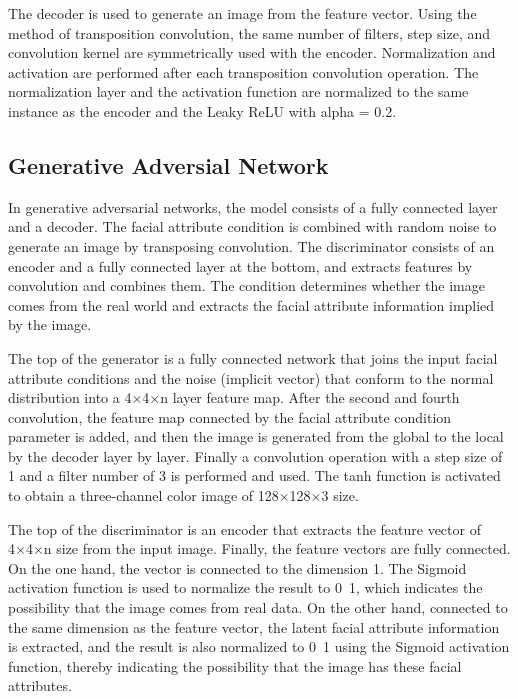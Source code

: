 The decoder is used to generate an image from the feature vector.
Using the method of transposition convolution, the same number of filters,
    step size, and convolution kernel are symmetrically used with the encoder.
Normalization and activation are performed after each transposition convolution operation.
The normalization layer and the activation function are normalized to the same instance as the encoder and the Leaky ReLU with alpha = 0.2.


\subsection{Generative Adversial Network}

In generative adversarial networks, the model consists of a fully connected layer and a decoder.
The facial attribute condition is combined with random noise to generate an image by transposing convolution.
The discriminator consists of an encoder and a fully connected layer at the bottom,
    and extracts features by convolution and combines them.
The condition determines whether the image comes from the real world and extracts the facial attribute information implied by the image.

The top of the generator is a fully connected network that joins the input facial attribute conditions and the noise (implicit vector) that conform to the normal distribution into a 4×4×n layer feature map.
After the second and fourth convolution, the feature map connected by the facial attribute condition parameter is added,
    and then the image is generated from the global to the local by the decoder layer by layer.
Finally a convolution operation with a step size of 1 and a filter number of 3 is performed and used.
The tanh function is activated to obtain a three-channel color image of 128×128×3 size.

The top of the discriminator is an encoder that extracts the feature vector of 4×4×n size from the input image.
Finally, the feature vectors are fully connected.
On the one hand, the vector is connected to the dimension 1.
The Sigmoid activation function is used to normalize the result to 0~1,
    which indicates the possibility that the image comes from real data.
On the other hand, connected to the same dimension as the feature vector,
    the latent facial attribute information is extracted,
    and the result is also normalized to 0~1 using the Sigmoid activation function,
    thereby indicating the possibility that the image has these facial attributes.

